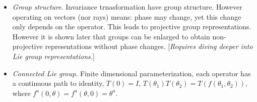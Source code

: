 \documentclass[12pt,a4paper]{article}
\begin{document}
\begin{itemize}
\item \textit{Group structure}. Invariance trnasformation have group structure. However operating on vectors (nor rays) means:  phase may change, yet this change only depends on the operator. This leads to projective group representations. However it is shown later that groups can be enlarged to obtain non-projective representations without phase changes. [\textit{Requires diving deeper into Lie group representations.}]
\item \textit{Connected Lie group}. Finite dimensional parameterization, each operator has a continuous path to identity, $T(0) = I$, $T(\theta_1) T(\theta_2) = T(f(\theta_1,\theta_2))$, where $f^a(0,\theta) = f^a(\theta,0) = \theta^a$.
\end{itemize}
\end{document}
